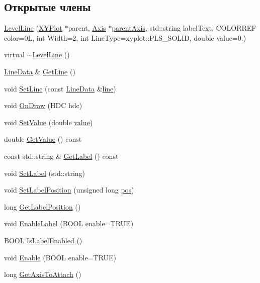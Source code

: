 \subsection*{Открытые члены}
\begin{DoxyCompactItemize}
\item 
\hyperlink{class_level_line_a834a35f51e6cee24e31aa04c122430e9}{Level\-Line} (\hyperlink{class_x_y_plot}{X\-Y\-Plot} $\ast$parent, \hyperlink{class_axis}{Axis} $\ast$\hyperlink{class_level_line_abcbf6e0a95632519d52b3c0828c926f4}{parent\-Axis}, std\-::string label\-Text, C\-O\-L\-O\-R\-R\-E\-F color=0\-L, int Width=2, int Line\-Type=xyplot\-::\-P\-L\-S\-\_\-\-S\-O\-L\-I\-D, double value=0.)
\item 
virtual \hyperlink{class_level_line_ad94c0efb69c76cb12213f658286222c1}{$\sim$\-Level\-Line} ()
\item 
\hyperlink{class_line_data}{Line\-Data} \& \hyperlink{class_level_line_a45589864d3115fbba529533c90c38175}{Get\-Line} ()
\item 
void \hyperlink{class_level_line_a1520645cbe9e84f0904f89eea6e32202}{Set\-Line} (const \hyperlink{class_line_data}{Line\-Data} \&\hyperlink{class_level_line_a98488406c76533a2e70d83197df2614b}{line})
\item 
void \hyperlink{class_level_line_a24695922b2d4ae08dddec50be83800be}{On\-Draw} (H\-D\-C hdc)
\item 
void \hyperlink{class_level_line_a85b3494c4eee0fce6168212dcf903b46}{Set\-Value} (double \hyperlink{class_level_line_ad006f9359dd288a3b189ab964bca9484}{value})
\item 
double \hyperlink{class_level_line_a7c505c12eb4b752f90e52ce77742154a}{Get\-Value} () const 
\item 
const std\-::string \& \hyperlink{class_level_line_a2a9e250359d220d62e1f41b1588201aa}{Get\-Label} () const 
\item 
void \hyperlink{class_level_line_a204f658355806691bc422270f054a6fd}{Set\-Label} (std\-::string)
\item 
void \hyperlink{class_level_line_a089e5b90314f945e221763e1906b031a}{Set\-Label\-Position} (unsigned long \hyperlink{class_level_line_ae4d3c142f618f987e6d7fc35e98e71d0}{pos})
\item 
long \hyperlink{class_level_line_af399e288f9d586a07a6a25250d65470a}{Get\-Label\-Position} ()
\item 
void \hyperlink{class_level_line_a6e10be13208d116ee6d7577b1a68a53e}{Enable\-Label} (B\-O\-O\-L enable=T\-R\-U\-E)
\item 
B\-O\-O\-L \hyperlink{class_level_line_a6c6a0f3b6bc892c63ab0b9d986c9d288}{Is\-Label\-Enabled} ()
\item 
void \hyperlink{class_level_line_a5722ff488016e9a23bb2f17d83d003ca}{Enable} (B\-O\-O\-L enable=T\-R\-U\-E)
\item 
long \hyperlink{class_level_line_a9c4fee2e8c939468ff52fd2204d6fd47}{Get\-Axis\-To\-Attach} ()
\end{DoxyCompactItemize}
